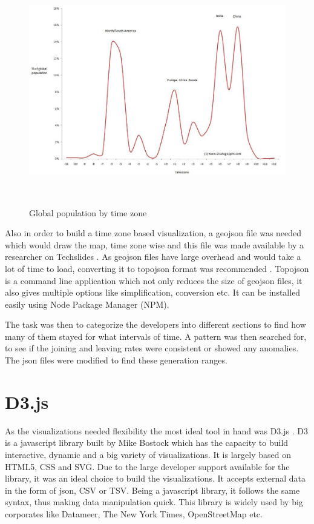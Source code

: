 \documentclass[double,12pt]{beavtex}
\begin{document}
\begin{figure}[!ht]
\centering
\includegraphics[width=160mm, height=100mm]{pop1.png}
\caption{Global population by time zone}
\end{figure}

Also in order to build a time zone based visualization, a geojson file was needed which would draw the map, time zone wise and this file was made available by a researcher on Techslides \cite{tech}. As geojson files have large overhead and would take a lot of time to load, converting it to topojson format was recommended \cite{tech}. Topojson is a command line application which not only reduces the size of geojson files, it also gives multiple options like simplification, conversion etc. It can be installed easily using Node Package Manager (NPM). 

The task was then to categorize the developers into different sections to find how many of them stayed for what intervals of time. A pattern was then searched for, to see if the joining
and leaving rates were consistent or showed any anomalies. The json files were modified to find these generation ranges.


\section{D3.js}
As the visualizations needed flexibility the most ideal tool in hand was D3.js \cite{d3}. D3 is a javascript library built by Mike Bostock which has the capacity to build
interactive, dynamic and a big variety of visualizations. It is largely based on HTML5, CSS and SVG. Due to the large developer support available for the library, it was an ideal choice to build the visualizations. It accepts external data in the form of json, CSV or TSV. Being a javascript library, it follows the same syntax, thus making data manipulation quick. This library is widely used by big corporates like Datameer, The New York Times, OpenStreetMap etc.
\end{document}
